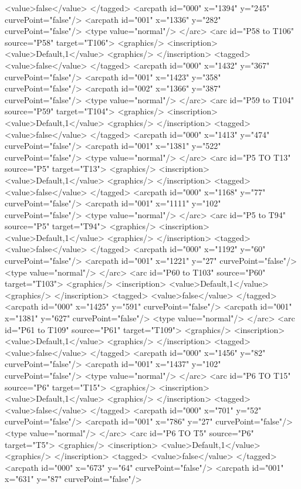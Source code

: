 <value>false</value>
</tagged>
<arcpath id="000" x="1394" y="245" curvePoint="false"/>
<arcpath id="001" x="1336" y="282" curvePoint="false"/>
<type value="normal"/>
</arc>
<arc id="P58 to T106" source="P58" target="T106">
<graphics/>
<inscription>
<value>Default,1</value>
<graphics/>
</inscription>
<tagged>
<value>false</value>
</tagged>
<arcpath id="000" x="1432" y="367" curvePoint="false"/>
<arcpath id="001" x="1423" y="358" curvePoint="false"/>
<arcpath id="002" x="1366" y="387" curvePoint="false"/>
<type value="normal"/>
</arc>
<arc id="P59 to T104" source="P59" target="T104">
<graphics/>
<inscription>
<value>Default,1</value>
<graphics/>
</inscription>
<tagged>
<value>false</value>
</tagged>
<arcpath id="000" x="1413" y="474" curvePoint="false"/>
<arcpath id="001" x="1381" y="522" curvePoint="false"/>
<type value="normal"/>
</arc>
<arc id="P5 TO T13" source="P5" target="T13">
<graphics/>
<inscription>
<value>Default,1</value>
<graphics/>
</inscription>
<tagged>
<value>false</value>
</tagged>
<arcpath id="000" x="1168" y="77" curvePoint="false"/>
<arcpath id="001" x="1111" y="102" curvePoint="false"/>
<type value="normal"/>
</arc>
<arc id="P5 to T94" source="P5" target="T94">
<graphics/>
<inscription>
<value>Default,1</value>
<graphics/>
</inscription>
<tagged>
<value>false</value>
</tagged>
<arcpath id="000" x="1192" y="60" curvePoint="false"/>
<arcpath id="001" x="1221" y="27" curvePoint="false"/>
<type value="normal"/>
</arc>
<arc id="P60 to T103" source="P60" target="T103">
<graphics/>
<inscription>
<value>Default,1</value>
<graphics/>
</inscription>
<tagged>
<value>false</value>
</tagged>
<arcpath id="000" x="1425" y="591" curvePoint="false"/>
<arcpath id="001" x="1381" y="627" curvePoint="false"/>
<type value="normal"/>
</arc>
<arc id="P61 to T109" source="P61" target="T109">
<graphics/>
<inscription>
<value>Default,1</value>
<graphics/>
</inscription>
<tagged>
<value>false</value>
</tagged>
<arcpath id="000" x="1456" y="82" curvePoint="false"/>
<arcpath id="001" x="1437" y="102" curvePoint="false"/>
<type value="normal"/>
</arc>
<arc id="P6 TO T15" source="P6" target="T15">
<graphics/>
<inscription>
<value>Default,1</value>
<graphics/>
</inscription>
<tagged>
<value>false</value>
</tagged>
<arcpath id="000" x="701" y="52" curvePoint="false"/>
<arcpath id="001" x="786" y="27" curvePoint="false"/>
<type value="normal"/>
</arc>
<arc id="P6 TO T5" source="P6" target="T5">
<graphics/>
<inscription>
<value>Default,1</value>
<graphics/>
</inscription>
<tagged>
<value>false</value>
</tagged>
<arcpath id="000" x="673" y="64" curvePoint="false"/>
<arcpath id="001" x="631" y="87" curvePoint="false"/>
